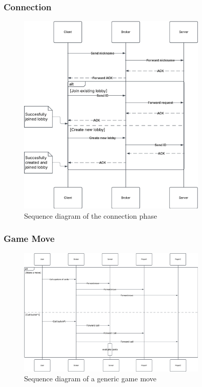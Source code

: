 \documentclass{scrartcl}
\begin{document}
\subsubsection{Connection}\label{connection}
\begin{figure}[H]
    \centering
    \includegraphics[width=0.8\textwidth]{figures/sequenceConnection.png}
    \caption{Sequence diagram of the connection phase}
    \label{fig:connection}
\end{figure}

\subsubsection{Game Move}\label{game-move}
\begin{figure}[H]
    \centering
    \includegraphics[width=0.8\textwidth]{figures/sequenceGameMove.png}
    \caption{Sequence diagram of a generic game move}
    \label{fig:gane-move}
\end{figure}
\end{document}
